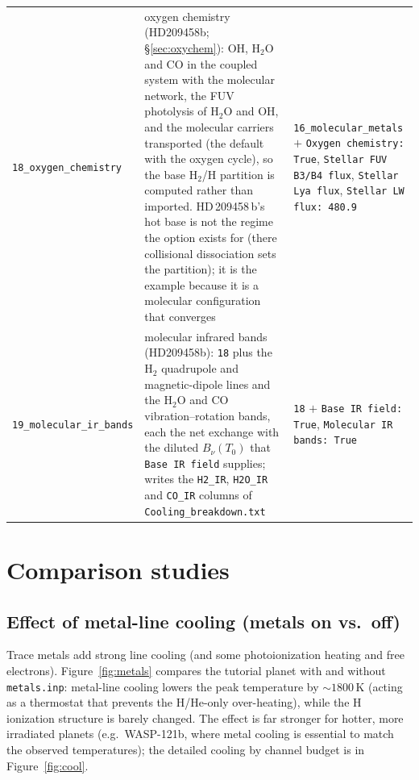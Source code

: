 \documentclass[english,a4paper]{my_memo}
\begin{document}
{\begin{longtable}{@{}lp{4.6cm}p{5.6cm}@{}}
\texttt{18\_oxygen\_chemistry} & oxygen chemistry (HD209458b;
  \S\ref{sec:oxychem}): OH, H$_2$O and CO in the coupled system with the
  molecular network, the FUV photolysis of H$_2$O and OH, and the molecular
  carriers transported (the default with the oxygen cycle), so the base
  H$_2$/H partition is computed rather than imported. HD\,209458\,b's hot base
  is not the regime the option exists for (there collisional dissociation
  sets the partition); it is the example because it is a molecular
  configuration that converges & \texttt{16\_molecular\_metals} $+$
  \texttt{Oxygen chemistry: True}, \texttt{Stellar FUV B3/B4 flux},
  \texttt{Stellar Lya flux}, \texttt{Stellar LW flux: 480.9} \\
\texttt{19\_molecular\_ir\_bands} & molecular infrared bands (HD209458b):
  \texttt{18} plus the H$_2$ quadrupole and magnetic-dipole lines and the
  H$_2$O and CO vibration--rotation bands, each the net exchange with the
  diluted $B_\nu(T_0)$ that \texttt{Base IR field} supplies; writes the
  \texttt{H2\_IR}, \texttt{H2O\_IR} and \texttt{CO\_IR} columns of
  \texttt{Cooling\_breakdown.txt} & \texttt{18} $+$ \texttt{Base IR field:
  True}, \texttt{Molecular IR bands: True} \\
\end{longtable}}

\section{Comparison studies}\label{sec:compare}

\subsection{Effect of metal-line cooling (metals on vs.\ off)}
Trace metals add strong line cooling (and some photoionization heating and free
electrons). Figure~\ref{fig:metals} compares the tutorial planet with and without
\texttt{metals.inp}: metal-line cooling lowers the peak temperature by
$\sim1800$\,K (acting as a thermostat that prevents the H/He-only over-heating),
while the H ionization structure is barely changed. The effect is far stronger
for hotter, more irradiated planets (e.g.\ WASP-121b, where metal cooling is
essential to match the observed temperatures); the detailed cooling by channel
budget is in Figure~\ref{fig:cool}.
\end{document}
